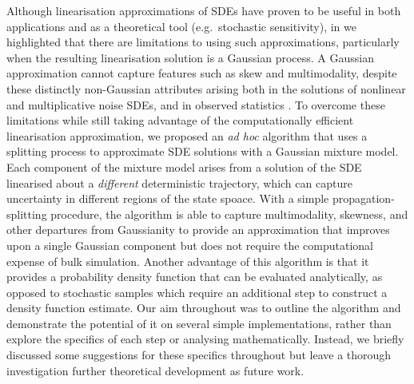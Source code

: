 Although linearisation approximations of SDEs have proven to be useful in both applications and as a theoretical tool (e.g.\ stochastic sensitivity), in  we highlighted that there are limitations to using such approximations, particularly when the resulting linearisation solution is a Gaussian process.
A Gaussian approximation cannot capture features such as skew and multimodality, despite these distinctly non-Gaussian attributes arising both in the solutions of nonlinear and multiplicative noise SDEs, and in observed statistics \citep{SuraEtAl_2005_MultiplicativeNoiseNonGaussianity,del-Castillo-Negrete_1998_AsymmetricTransportNonGaussian,BraccoEtAl_2000_VelocityProbabilityDensity}.
To overcome these limitations while still taking advantage of the computationally efficient linearisation approximation, we proposed an \emph{ad hoc} algorithm that uses a splitting process to approximate SDE solutions with a Gaussian mixture model.
Each component of the mixture model arises from a solution of the SDE linearised about a \emph{different} deterministic trajectory, which can capture uncertainty in different regions of the state spoace.
With a simple propagation-splitting procedure, the algorithm is able to capture multimodality, skewness, and other departures from Gaussianity to provide an approximation that improves upon a single Gaussian component but does not require the computational expense of bulk simulation.
Another advantage of this algorithm is that it provides a probability density function that can be evaluated analytically, as opposed to stochastic samples which require an additional step to construct a density function estimate.
Our aim throughout was to outline the algorithm and demonstrate the potential of it on several simple implementations, rather than explore the specifics of each step or analysing mathematically.
Instead, we briefly discussed some suggestions for these specifics throughout  but leave a thorough investigation further theoretical development as future work.

